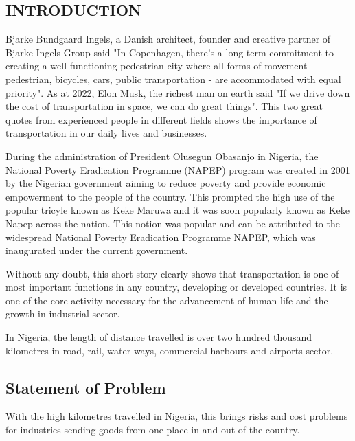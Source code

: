 \documentclass{article}
\begin{document}
\newpage

\begin{center}
\section{INTRODUCTION}
\end{center}
Bjarke Bundgaard Ingels, a Danish architect, founder and creative partner of Bjarke Ingels Group said "In Copenhagen, there's a long-term commitment to creating a well-functioning pedestrian city where all forms of movement - pedestrian, bicycles, cars, public transportation - are accommodated with equal priority". As at 2022, Elon Musk, the richest man on earth said "If we drive down the cost of transportation in space, we can do great things". This two great quotes from experienced people in different fields shows the importance of transportation in our daily lives and businesses.

During the administration of President Olusegun Obasanjo in Nigeria, the National Poverty Eradication Programme (NAPEP) program was created in 2001 by the Nigerian government aiming to reduce poverty and provide economic empowerment to the people of the country. This prompted the high use of the popular tricyle known as Keke Maruwa and it was soon popularly known as Keke Napep across the nation. This notion was popular and can be attributed to the widespread National Poverty Eradication Programme NAPEP, which was inaugurated under the current government.

Without any doubt, this short story clearly shows that transportation is one of most important functions in any country, developing or developed countries. It is one of the core activity necessary for the advancement of human life and the growth in industrial sector.

In Nigeria, the length of distance travelled is over two hundred thousand kilometres in road, rail, water ways, commercial harbours and airports sector.

\newpage

\begin{center}
\subsection{Statement of Problem}
\end{center}
With the high kilometres travelled in Nigeria, this brings risks and cost problems for industries sending goods from one place in and out of the country.
\end{document}

